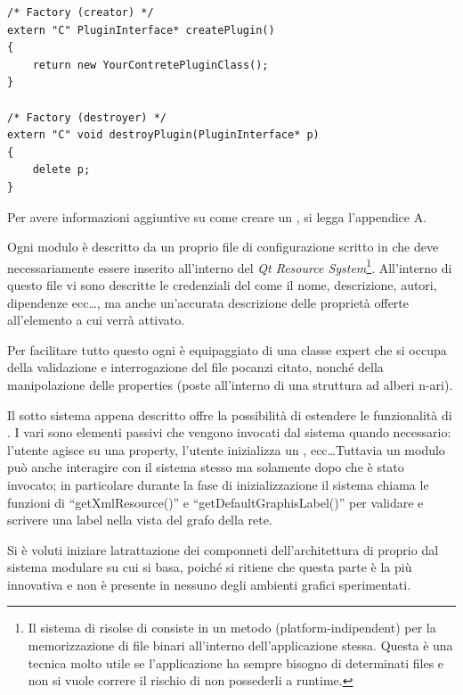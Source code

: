 \begin{lstlisting}
/* Factory (creator) */
extern "C" PluginInterface* createPlugin()
{
	return new YourContretePluginClass();
}

/* Factory (destroyer) */
extern "C" void destroyPlugin(PluginInterface* p)
{
	delete p;
}
\end{lstlisting}
Per avere informazioni aggiuntive su come creare un \plugin{}, si legga l'appendice A.

Ogni modulo è descritto da un proprio file di configurazione scritto in \xml{} che deve necessariamente essere inserito all'interno del \emph{Qt Resource System}\footnote{Il sistema di risolse di \qt{} consiste in un metodo (platform-indipendent) per la memorizzazione di file binari all'interno dell'applicazione stessa. Questa è una tecnica molto utile se l'applicazione ha sempre bisogno di determinati files e non si vuole correre il rischio di non possederli a runtime.}. All'interno di questo file vi sono descritte le credenziali del \plugin{} come il nome, descrizione, autori, dipendenze ecc\ldots, ma anche un'accurata descrizione delle proprietà offerte all'elemento a cui verrà attivato.

Per facilitare tutto questo ogni \proxy{} è equipaggiato di una classe expert che si occupa della validazione e interrogazione del file \xml{} pocanzi citato, nonché della manipolazione delle properties (poste all'interno di una struttura ad alberi n-ari).

Il sotto sistema appena descritto offre la possibilità di estendere le funzionalità di \visualnetkit{}. I vari \plugin{} sono elementi passivi che vengono invocati dal sistema quando necessario: l'utente agisce su una property, l'utente inizializza un \plugin{}, ecc\ldots Tuttavia un modulo può anche interagire con il sistema stesso ma solamente dopo che è stato invocato; in particolare durante la fase di inizializzazione il sistema chiama le funzioni di ``getXmlResource()'' e ``getDefaultGraphisLabel()'' per validare e scrivere una label nella vista del grafo della rete.

Si è voluti iniziare latrattazione dei componneti dell'architettura di \visualnetkit{} proprio dal sistema modulare su cui si basa, poiché si ritiene che questa parte è la più innovativa e non è presente in nessuno degli ambienti grafici sperimentati.

